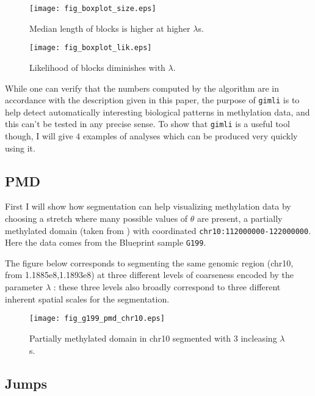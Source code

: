 \documentclass[12pt]{amsart}
\newcommand{\gimli}{\texttt{gimli}}
\begin{document}
\begin{figure}\label{fig_boxplot_size}
\texttt{[image: fig\_boxplot\_size.eps]}
\caption{Median length of blocks is higher at higher $\lambda$s.}
\end{figure}

\begin{figure}\label{fig_boxplot_lik}
\texttt{[image: fig\_boxplot\_lik.eps]}
\caption{Likelihood of blocks diminishes with $\lambda$.}
\end{figure}

While one can verify that the numbers computed by the algorithm are in 
accordance with the description
given in this paper, the purpose of \gimli{} is to help 
detect automatically interesting biological patterns in methylation data, 
and this can't be tested in any 
precise sense. To show that \gimli{} is a useful tool
though, I will give $4$ examples of analyses which can be produced very quickly
using it. 

\subsection{PMD}

First I will show how segmentation can help visualizing methylation data by choosing
a stretch where many possible values of $\theta$ are present, a partially
methylated domain (taken from \cite{pmd}) with coordinated 
\texttt{chr10:112000000-122000000}. Here the data comes from the Blueprint sample \texttt{G199}. 


The figure below corresponds to segmenting the same genomic region (chr10, from 1.1885e8,1.1893e8) at 
three different levels of coarseness encoded by the parameter $\lambda$ : 
these three levels also broadly correspond to three different inherent spatial scales for the segmentation.

\begin{figure}\label{fig_g199_pmd_chr10.eps}
\texttt{[image: fig\_g199\_pmd\_chr10.eps]}
\caption{Partially methylated domain in chr10 segmented with $3$ incleasing $\lambda$s.}
\end{figure}


\subsection{Jumps}
\end{document}
